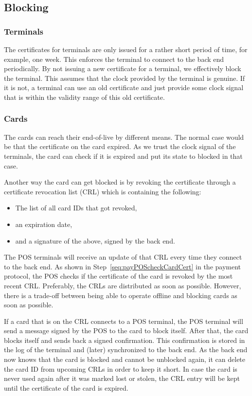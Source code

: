 \subsection{Blocking} \label{sec:blocking}
\subsubsection{Terminals} \label{sec:blockTerminal}
The certificates for terminals are only issued for a rather short period of time, for example, one week.
This enforces the terminal to connect to the back end periodically.
By not issuing a new certificate for a terminal, we effectively block the terminal.
This assumes that the clock provided by the terminal is genuine.
If it is not, a terminal can use an old certificate and just provide some clock signal that is within the validity range of this old certificate.

\subsubsection{Cards} \label{sec:blockCards}
The cards can reach their end-of-live by different means.
The normal case would be that the certificate on the card expired.
As we trust the clock signal of the terminals, the card can check if it is expired and put its state to blocked in that case.


Another way the card can get blocked is by revoking the certificate through a certificate revocation list (CRL) which is containing the following:
\begin{itemize}
    \item The list of all card IDs that got revoked,
    \item an expiration date,
    \item and a signature of the above, signed by the back end.
\end{itemize}
The POS terminals will receive an update of that CRL every time they connect to the back end.
As shown in Step~\ref{seq:payPOScheckCardCert} in the payment protocol, the POS checks if the certificate of the card is revoked by the most recent CRL\@.
Preferably, the CRLs are distributed as soon as possible. 
However, there is a trade-off between being able to operate offline and blocking cards as soon as possible.

If a card that is on the CRL connects to a POS terminal, the POS terminal will send a message signed by the POS to the card to block itself.
After that, the card blocks itself and sends back a signed confirmation.
This confirmation is stored in the log of the terminal and (later) synchronized to the back end.
As the back end now knows that the card is blocked and cannot be unblocked again, it can delete the card ID from upcoming CRLs in order to keep it short.
In case the card is never used again after it was marked lost or stolen, the CRL entry will be kept until the certificate of the card is expired.


